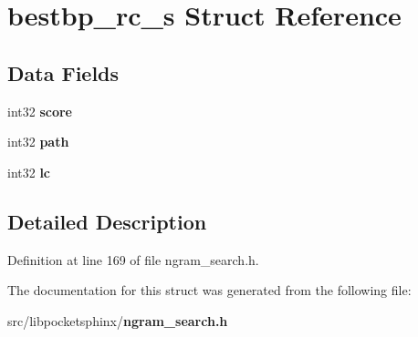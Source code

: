 \section{bestbp\-\_\-rc\-\_\-s Struct Reference}
\label{structbestbp__rc__s}
\subsection*{Data Fields}
\begin{DoxyCompactItemize}
\item 
int32 {\bfseries score}\label{structbestbp__rc__s_a22fb17e130599acbde1fac4debcca469}

\item 
int32 {\bfseries path}\label{structbestbp__rc__s_a3cc3a67aa32da9669c5305f7ebb2e7ce}

\item 
int32 {\bfseries lc}\label{structbestbp__rc__s_a33fd8891076deb0d592e038cddca66a4}

\end{DoxyCompactItemize}


\subsection{Detailed Description}


Definition at line 169 of file ngram\-\_\-search.\-h.



The documentation for this struct was generated from the following file\-:\begin{DoxyCompactItemize}
\item 
src/libpocketsphinx/{\bf ngram\-\_\-search.\-h}\end{DoxyCompactItemize}
